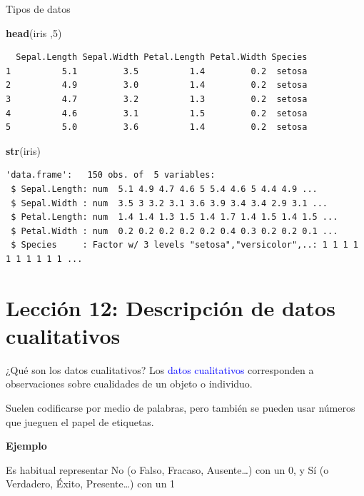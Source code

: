 \documentclass[
  ignorenonframetext,
  aspectratio=169]{beamer}
\newenvironment{Shaded}{\begin{snugshade}}{\end{snugshade}}
\newcommand{\DecValTok}[1]{\textcolor[rgb]{0.00,0.00,0.81}{#1}}
\newcommand{\FunctionTok}[1]{\textcolor[rgb]{0.13,0.29,0.53}{\textbf{#1}}}
\newcommand{\NormalTok}[1]{#1}
\newcommand\blue[1]{\textcolor{blue}{#1}}
\begin{document}
\begin{frame}[fragile]{Tipos de datos}
\label{tipos-de-datos-3}
\begin{Shaded}
\begin{Highlighting}[]
\FunctionTok{head}\NormalTok{(iris ,}\DecValTok{5}\NormalTok{)}
\end{Highlighting}
\end{Shaded}

\begin{verbatim}
  Sepal.Length Sepal.Width Petal.Length Petal.Width Species
1          5.1         3.5          1.4         0.2  setosa
2          4.9         3.0          1.4         0.2  setosa
3          4.7         3.2          1.3         0.2  setosa
4          4.6         3.1          1.5         0.2  setosa
5          5.0         3.6          1.4         0.2  setosa
\end{verbatim}

\begin{Shaded}
\begin{Highlighting}[]
\FunctionTok{str}\NormalTok{(iris)}
\end{Highlighting}
\end{Shaded}

\begin{verbatim}
'data.frame':   150 obs. of  5 variables:
 $ Sepal.Length: num  5.1 4.9 4.7 4.6 5 5.4 4.6 5 4.4 4.9 ...
 $ Sepal.Width : num  3.5 3 3.2 3.1 3.6 3.9 3.4 3.4 2.9 3.1 ...
 $ Petal.Length: num  1.4 1.4 1.3 1.5 1.4 1.7 1.4 1.5 1.4 1.5 ...
 $ Petal.Width : num  0.2 0.2 0.2 0.2 0.2 0.4 0.3 0.2 0.2 0.1 ...
 $ Species     : Factor w/ 3 levels "setosa","versicolor",..: 1 1 1 1 1 1 1 1 1 1 ...
\end{verbatim}
\end{frame}

\section{Lección 12: Descripción de datos
cualitativos}\label{lecciuxf3n-12-descripciuxf3n-de-datos-cualitativos}

\begin{frame}{¿Qué son los datos cualitativos?}
\label{quuxe9-son-los-datos-cualitativos}
Los \blue{datos cualitativos} corresponden a observaciones sobre
cualidades de un objeto o individuo.

Suelen codificarse por medio de palabras, pero también se pueden usar
números que jueguen el papel de etiquetas.

\textbf{Ejemplo}

Es habitual representar No (o Falso, Fracaso, Ausente\ldots) con un 0, y
Sí (o Verdadero, Éxito, Presente\ldots) con un 1
\end{frame}
\end{document}
